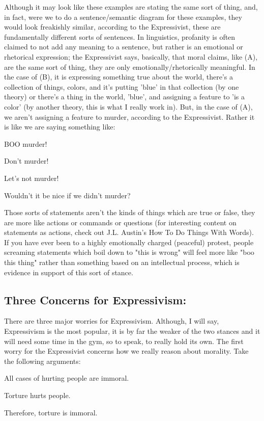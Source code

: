 Although it may look like these examples are stating the same sort of thing, and, in fact, were we to  do a sentence/semantic diagram for these examples, they would look freakishly similar, according to the Expressivist, these are fundamentally different sorts of sentences. In linguistics, profanity is often claimed to not add any meaning to a sentence, but rather is an emotional or rhetorical expression; the Expressivist says, basically, that moral claims, like (A), are the same sort of thing, they are only emotionally/rhetorically meaningful. In the case of (B), it is expressing something true about the world, there's a collection of things, colors, and it's putting 'blue' in that collection (by one theory) or there's a thing in the world, 'blue', and assigning a feature to 'is a color' (by another theory, this is what I really work in). But, in the case of (A), we aren’t assigning a feature to murder, according to the Expressivist. Rather it is like we are saying something like:
\begin{earg}
    \item[]BOO murder!
    \item[]Don’t murder!
    \item[]Let’s not murder!
    \item[]Wouldn’t it be nice if we didn’t murder?
\end{earg}
Those sorts of statements aren’t the kinds of things which are true or false, they are more like actions or commands or questions (for interesting content on statements as actions, check out J.L. Austin's How To Do Things With Words). If you have ever been to a highly emotionally charged (peaceful) protest, people screaming statements which boil down to "this is wrong" will feel more like "boo this thing" rather than something based on an intellectual process, which is evidence in support of this sort of stance. 

\subsection{Three Concerns for Expressivism:}

There are three major worries for Expressivism. Although, I will say, Expressivism is the most popular, it is by far the weaker of the two stances and it will need some time in the gym, so to speak, to really hold its own. The first worry for the Expressivist concerns how we really reason about morality. Take the following arguments:

    \begin{earg}
    \item[]All cases of hurting people are immoral.
    \item[]Torture hurts people.
    \item[]Therefore, torture is immoral.
   \end{earg}

